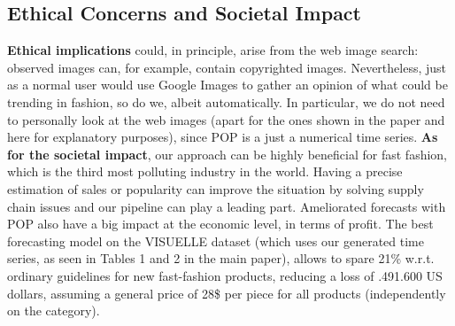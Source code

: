 \documentclass[runningheads]{llncs}
\newcommand{\snamebig}[0] {POP\xspace}
\begin{document}
\subsection{Ethical Concerns and Societal Impact} \label{sec:ethical} 
\textbf{Ethical implications} could, in principle, arise from the web image search: observed images can, for example, contain copyrighted images. Nevertheless, just as a normal user would use Google Images to gather an opinion of what could be trending in fashion, so do we, albeit automatically. In particular, we do not need to personally look at the web images (apart for the ones shown in the paper and here for explanatory purposes), since \snamebig is a just a numerical time series. \textbf{As for the societal impact}, our approach can be highly beneficial for fast fashion, which is the third most polluting industry in the world. Having a precise estimation of sales or popularity can improve the situation by solving supply chain issues and our pipeline can play a leading part. Ameliorated forecasts with \snamebig also have a big impact at the economic level, in terms of profit. The best forecasting model on the VISUELLE dataset (which uses our generated time series, as seen in Tables 1 and 2 in the main paper), allows to spare 21\% w.r.t. ordinary guidelines for new fast-fashion products, reducing a loss of \3.491.600 US dollars, assuming a general price of 28\$ per piece for all products (independently on the category).
 
\clearpage


\end{document}
